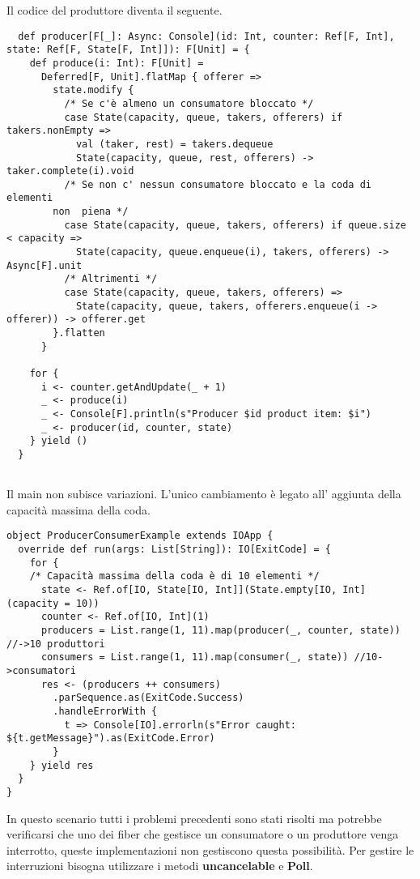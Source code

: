 \noindent Il codice del produttore diventa il seguente.
\begin{verbatim}
  def producer[F[_]: Async: Console](id: Int, counter: Ref[F, Int], state: Ref[F, State[F, Int]]): F[Unit] = {
    def produce(i: Int): F[Unit] =
      Deferred[F, Unit].flatMap { offerer =>
        state.modify {
          /* Se c'è almeno un consumatore bloccato */
          case State(capacity, queue, takers, offerers) if takers.nonEmpty =>
            val (taker, rest) = takers.dequeue
            State(capacity, queue, rest, offerers) -> taker.complete(i).void
          /* Se non c' nessun consumatore bloccato e la coda di elementi
        non  piena */
          case State(capacity, queue, takers, offerers) if queue.size < capacity =>
            State(capacity, queue.enqueue(i), takers, offerers) -> Async[F].unit
          /* Altrimenti */
          case State(capacity, queue, takers, offerers) =>
            State(capacity, queue, takers, offerers.enqueue(i -> offerer)) -> offerer.get
        }.flatten
      }

    for {
      i <- counter.getAndUpdate(_ + 1) 
      _ <- produce(i)
      _ <- Console[F].println(s"Producer $id product item: $i")
      _ <- producer(id, counter, state)
    } yield ()
  }
    
\end{verbatim}

\noindent Il main non subisce variazioni. L'unico cambiamento è legato all' aggiunta della capacità massima della coda.

\begin{verbatim}
object ProducerConsumerExample extends IOApp {
  override def run(args: List[String]): IO[ExitCode] = {
    for {
    /* Capacità massima della coda è di 10 elementi */
      state <- Ref.of[IO, State[IO, Int]](State.empty[IO, Int](capacity = 10))
      counter <- Ref.of[IO, Int](1)
      producers = List.range(1, 11).map(producer(_, counter, state)) //->10 produttori
      consumers = List.range(1, 11).map(consumer(_, state)) //10->consumatori
      res <- (producers ++ consumers)
        .parSequence.as(ExitCode.Success) 
        .handleErrorWith {
          t => Console[IO].errorln(s"Error caught: ${t.getMessage}").as(ExitCode.Error)
        }
    } yield res
  }
}
\end{verbatim}
\noindent In questo scenario tutti i problemi precedenti sono stati risolti ma potrebbe verificarsi che uno dei fiber che gestisce un consumatore o un produttore venga interrotto, queste implementazioni non gestiscono questa possibilità. Per gestire le interruzioni bisogna utilizzare i metodi \textbf{uncancelable} e \textbf{Poll}.

